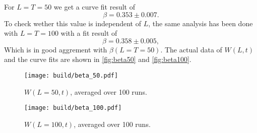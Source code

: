 For $L=T=50$ we get a curve fit result of
\[
  \beta = 0.353 \pm 0.007.
\]
To check wether this value is independent of $L$, the same analysis has been done with $L = T = 100$ with a fit result
of
\[
  \beta = 0.358 \pm 0.005,
\]
Which is in good aggrement with $\beta(L=T=50)$. The actual data of $W(L,t)$ and the curve fits are shown in
\autoref{fig:beta50} and
\autoref{fig:beta100}.
\begin{figure}
	\centering
  \texttt{[image: build/beta\_50.pdf]}
  \caption{$W(L=50,t)$, averaged over 100 runs.}
  \label{fig:beta50}
\end{figure}
\begin{figure}
	\centering
  \texttt{[image: build/beta\_100.pdf]}
  \caption{$W(L=100,t)$, averaged over 100 runs.}
  \label{fig:beta100}
\end{figure}
